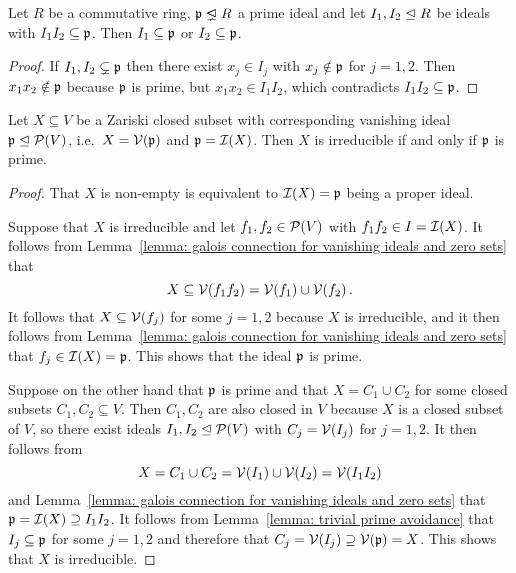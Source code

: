 \begin{lemma}
  \label{lemma: trivial prime avoidance}
  Let $R$ be a commutative ring, $\mf{p} \idealneq R$ a prime ideal and let $I_1, I_2 \trianglelefteq R$ be ideals with $I_1 I_2 \subseteq \mathfrak{p}$.
  Then $I_1 \subseteq \mathfrak{p}$ or $I_2 \subseteq \mathfrak{p}$.
\end{lemma}


\begin{proof}
  If $I_1, I_2 \subsetneq \mathfrak{p}$ then there exist $x_j \in I_j$ with $x_j \notin \mathfrak{p}$ for $j = 1,2$.
  Then $x_1 x_2 \notin \mathfrak{p}$ because $\mathfrak{p}$ is prime, but $x_1 x_2 \in I_1 I_2$, which contradicts $I_1 I_2 \subseteq \mathfrak{p}$.
\end{proof}


\begin{lemma}
  \label{lemma: X is irreducible iff I(X) is prime}
  Let $X \subseteq V$ be a Zariski closed subset with corresponding vanishing ideal $\mathfrak{p} \trianglelefteq \mathcal{P}(V)$, i.e.\ $X = \mathcal{V}(\mathfrak{p})$ and $\mathfrak{p} = \mathcal{I}(X)$.
  Then $X$ is irreducible if and only if $\mathfrak{p}$ is prime.
\end{lemma}


\begin{proof}
  That $X$ is non-empty is equivalent to $\mathcal{I}(X) = \mathfrak{p}$ being a proper ideal.
  
  Suppose that $X$ is irreducible and let $f_1, f_2 \in \mathcal{P}(V)$ with $f_1 f_2 \in I = \mathcal{I}(X)$.
  It follows from Lemma~\ref{lemma: galois connection for vanishing ideals and zero sets} that
  \[
              X
    \subseteq \mathcal{V}(f_1 f_2)
    =         \mathcal{V}(f_1) \cup \mathcal{V}(f_2) \,.
  \]
  It follows that $X \subseteq \mathcal{V}(f_j)$ for some $j = 1,2$ because $X$ is irreducible, and it then follows from Lemma~\ref{lemma: galois connection for vanishing ideals and zero sets} that $f_j \in \mathcal{I}(X) = \mathfrak{p}$.
  This shows that the ideal $\mathfrak{p}$ is prime.
  
  Suppose on the other hand that $\mathfrak{p}$ is prime and that $X = C_1 \cup C_2$ for some closed subsets $C_1, C_2 \subseteq V$.
  Then $C_1, C_2$ are also closed in $V$ because $X$ is a closed subset of $V$, so there exist ideals $I_1, I_2 \trianglelefteq \mathcal{P}(V)$ with $C_j = \mathcal{V}(I_j)$ for $j = 1,2$.
  It then follows from
  \[
      X
    = C_1 \cup C_2
    = \mathcal{V}(I_1) \cup \mathcal{V}(I_2)
    = \mathcal{V}(I_1 I_2)
  \]
  and Lemma~\ref{lemma: galois connection for vanishing ideals and zero sets} that $\mathfrak{p} = \mathcal{I}(X) \supseteq I_1 I_2$.
  It follows from Lemma~\ref{lemma: trivial prime avoidance} that $I_j \subseteq \mathfrak{p}$ for some $j = 1,2$ and therefore that $C_j = \mathcal{V}(I_j) \supseteq \mathcal{V}(\mathfrak{p}) = X$.
  This shows that $X$ is irreducible.
\end{proof}


